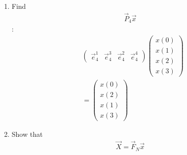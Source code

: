 \documentclass[journal,12pt,twocolumn]{IEEEtran}
\newcommand{\myvec}[1]{\ensuremath{\begin{pmatrix}#1\end{pmatrix}}}
\renewcommand\thesection{\arabic{section}}
\begin{document}
\begin{enumerate}[label=\arabic*.,ref=\thesection.\theenumi]
\begin{align}
\begin{pmatrix}
I_{N/2} F_{N/2} & D_{N/2} F_{N/2}\\
I_{N/2} F_{N/2} & -D_{N/2} F_{N/2}
\end{pmatrix}=\begin{bmatrix}
I_{N/2} & D_{N/2}\\
I_{N/2} & -D_{N/2}
\end{bmatrix}\begin{bmatrix}
F_{N/2} & 0\\
0 & F_{N/2}
\end{bmatrix}\\
&=\begin{pmatrix}
\vec{f}_{\textbf{odd}}\\
\vec{f}_{\textbf{even}}
\end{pmatrix}\\
&\therefore \vec{F}_N=\begin{pmatrix}
\vec{f}_{\textbf{odd}}\\
\vec{f}_{\textbf{even}}
\end{pmatrix}
\vec{P}_{N}=\begin{bmatrix}
I_{N/2} & D_{N/2}\\
I_{N/2} & -D_{N/2}
\end{bmatrix}\begin{bmatrix}
F_{N/2} & 0\\
0 & F_{N/2}
\end{bmatrix}P_{N}
\end{align}
\item Find 
    \begin{align}
	     \vec{P}_4 \vec{x}
    \end{align}
    \solution:
    \begin{align}
    &\myvec{\vec{e}_4^{1} &\vec{e}_4^{3} &\vec{e}_4^{2} &\vec{e}_4^{4} } \begin{pmatrix}
    x(0)\\
    x(1)\\
    x(2)\\
    x(3)
    \end{pmatrix}\\
    &=\begin{pmatrix}
    x(0)\\
    x(2)\\
    x(1)\\
    x(3)
    \end{pmatrix}
    \end{align}
\item Show that 
    \begin{align}
	    \vec{X} = \vec{F}_N \vec{x}

\end{align}
\end{enumerate}
\end{document}
